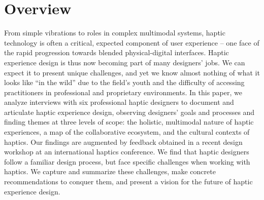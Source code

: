 \section{Overview}
From simple vibrations to roles in complex multimodal systems, haptic technology is often a critical, expected component of user experience -- one face of the rapid progression towards blended physical-digital interfaces.
Haptic experience design is thus now becoming part of many designers' jobs. We can expect it to present unique challenges, and yet we know almost nothing of what it looks like ``in the wild''
due to the field's youth and the difficulty of accessing practitioners %
in professional and proprietary environments.
In this paper, we analyze interviews with six professional haptic designers to document and articulate haptic experience design, observing designers' goals and processes and finding themes at three levels of scope: the holistic, multimodal nature of haptic experiences, a map of the collaborative ecosystem, and the cultural contexts of haptics.
%
Our findings are 
augmented by %
feedback obtained in a recent design workshop at an international haptics conference.
We find %
that haptic designers follow a familiar design process, but face specific challenges when working with haptics. 
We capture and summarize these challenges, make concrete recommendations to conquer them, and present a vision for the future of haptic experience design.


